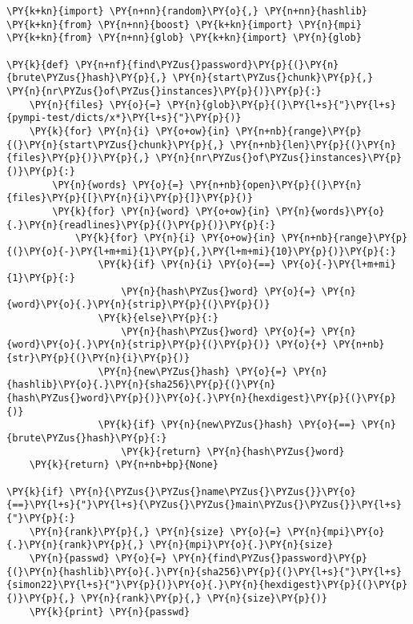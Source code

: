 \begin{Verbatim}[commandchars=\\\{\}]
\PY{k+kn}{import} \PY{n+nn}{random}\PY{o}{,} \PY{n+nn}{hashlib}
\PY{k+kn}{from} \PY{n+nn}{boost} \PY{k+kn}{import} \PY{n}{mpi}
\PY{k+kn}{from} \PY{n+nn}{glob} \PY{k+kn}{import} \PY{n}{glob}

\PY{k}{def} \PY{n+nf}{find\PYZus{}password}\PY{p}{(}\PY{n}{brute\PYZus{}hash}\PY{p}{,} \PY{n}{start\PYZus{}chunk}\PY{p}{,} \PY{n}{nr\PYZus{}of\PYZus{}instances}\PY{p}{)}\PY{p}{:}
	\PY{n}{files} \PY{o}{=} \PY{n}{glob}\PY{p}{(}\PY{l+s}{"}\PY{l+s}{pympi-test/dicts/x*}\PY{l+s}{"}\PY{p}{)}
	\PY{k}{for} \PY{n}{i} \PY{o+ow}{in} \PY{n+nb}{range}\PY{p}{(}\PY{n}{start\PYZus{}chunk}\PY{p}{,} \PY{n+nb}{len}\PY{p}{(}\PY{n}{files}\PY{p}{)}\PY{p}{,} \PY{n}{nr\PYZus{}of\PYZus{}instances}\PY{p}{)}\PY{p}{:} 
		\PY{n}{words} \PY{o}{=} \PY{n+nb}{open}\PY{p}{(}\PY{n}{files}\PY{p}{[}\PY{n}{i}\PY{p}{]}\PY{p}{)}
		\PY{k}{for} \PY{n}{word} \PY{o+ow}{in} \PY{n}{words}\PY{o}{.}\PY{n}{readlines}\PY{p}{(}\PY{p}{)}\PY{p}{:}
			\PY{k}{for} \PY{n}{i} \PY{o+ow}{in} \PY{n+nb}{range}\PY{p}{(}\PY{o}{-}\PY{l+m+mi}{1}\PY{p}{,}\PY{l+m+mi}{10}\PY{p}{)}\PY{p}{:}
				\PY{k}{if} \PY{n}{i} \PY{o}{==} \PY{o}{-}\PY{l+m+mi}{1}\PY{p}{:}
					\PY{n}{hash\PYZus{}word} \PY{o}{=} \PY{n}{word}\PY{o}{.}\PY{n}{strip}\PY{p}{(}\PY{p}{)}
				\PY{k}{else}\PY{p}{:}
					\PY{n}{hash\PYZus{}word} \PY{o}{=} \PY{n}{word}\PY{o}{.}\PY{n}{strip}\PY{p}{(}\PY{p}{)} \PY{o}{+} \PY{n+nb}{str}\PY{p}{(}\PY{n}{i}\PY{p}{)}
				\PY{n}{new\PYZus{}hash} \PY{o}{=} \PY{n}{hashlib}\PY{o}{.}\PY{n}{sha256}\PY{p}{(}\PY{n}{hash\PYZus{}word}\PY{p}{)}\PY{o}{.}\PY{n}{hexdigest}\PY{p}{(}\PY{p}{)}
				\PY{k}{if} \PY{n}{new\PYZus{}hash} \PY{o}{==} \PY{n}{brute\PYZus{}hash}\PY{p}{:}
					\PY{k}{return} \PY{n}{hash\PYZus{}word}
	\PY{k}{return} \PY{n+nb+bp}{None}

\PY{k}{if} \PY{n}{\PYZus{}\PYZus{}name\PYZus{}\PYZus{}}\PY{o}{==}\PY{l+s}{"}\PY{l+s}{\PYZus{}\PYZus{}main\PYZus{}\PYZus{}}\PY{l+s}{"}\PY{p}{:}
	\PY{n}{rank}\PY{p}{,} \PY{n}{size} \PY{o}{=} \PY{n}{mpi}\PY{o}{.}\PY{n}{rank}\PY{p}{,} \PY{n}{mpi}\PY{o}{.}\PY{n}{size}
	\PY{n}{passwd} \PY{o}{=} \PY{n}{find\PYZus{}password}\PY{p}{(}\PY{n}{hashlib}\PY{o}{.}\PY{n}{sha256}\PY{p}{(}\PY{l+s}{"}\PY{l+s}{simon22}\PY{l+s}{"}\PY{p}{)}\PY{o}{.}\PY{n}{hexdigest}\PY{p}{(}\PY{p}{)}\PY{p}{,} \PY{n}{rank}\PY{p}{,} \PY{n}{size}\PY{p}{)}
	\PY{k}{print} \PY{n}{passwd}
\end{Verbatim}
